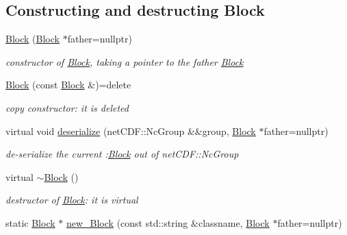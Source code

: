 \subsection*{Constructing and destructing Block}
\begin{DoxyCompactItemize}
\item 
\mbox{\hyperlink{class_s_m_spp__di__unipi__it_1_1_block_adcd18ebef72af31e0d4baae7dc47eeda}{Block}} (\mbox{\hyperlink{class_s_m_spp__di__unipi__it_1_1_block}{Block}} $\ast$father=nullptr)
\begin{DoxyCompactList}\small\item\em constructor of \mbox{\hyperlink{class_s_m_spp__di__unipi__it_1_1_block}{Block}}, taking a pointer to the father \mbox{\hyperlink{class_s_m_spp__di__unipi__it_1_1_block}{Block}} \end{DoxyCompactList}\item 
\mbox{\hyperlink{class_s_m_spp__di__unipi__it_1_1_block_a0c41139a69c97e5a3a6d2953444e8ef8}{Block}} (const \mbox{\hyperlink{class_s_m_spp__di__unipi__it_1_1_block}{Block}} \&)=delete
\begin{DoxyCompactList}\small\item\em copy constructor\+: it is deleted \end{DoxyCompactList}\item 
virtual void \mbox{\hyperlink{class_s_m_spp__di__unipi__it_1_1_block_a4b98fbc561cffa3e92a2690c831ab3c9}{deserialize}} (net\+C\+D\+F\+::\+Nc\+Group \&\&group, \mbox{\hyperlink{class_s_m_spp__di__unipi__it_1_1_block}{Block}} $\ast$father=nullptr)
\begin{DoxyCompactList}\small\item\em de-\/serialize the current \+:\mbox{\hyperlink{class_s_m_spp__di__unipi__it_1_1_block}{Block}} out of net\+C\+D\+F\+::\+Nc\+Group \end{DoxyCompactList}\item 
virtual \mbox{\hyperlink{class_s_m_spp__di__unipi__it_1_1_block_a36ecbe6284a6256224aba407cfabc5e6}{$\sim$\+Block}} ()
\begin{DoxyCompactList}\small\item\em destructor of \mbox{\hyperlink{class_s_m_spp__di__unipi__it_1_1_block}{Block}}\+: it is virtual \end{DoxyCompactList}\item 
static \mbox{\hyperlink{class_s_m_spp__di__unipi__it_1_1_block}{Block}} $\ast$ \mbox{\hyperlink{class_s_m_spp__di__unipi__it_1_1_block_a0fb67cbfab69b75e3bc6ad92d581bd2e}{new\+\_\+\+Block}} (const std\+::string \&classname, \mbox{\hyperlink{class_s_m_spp__di__unipi__it_1_1_block}{Block}} $\ast$father=nullptr)

\end{DoxyCompactItemize}
